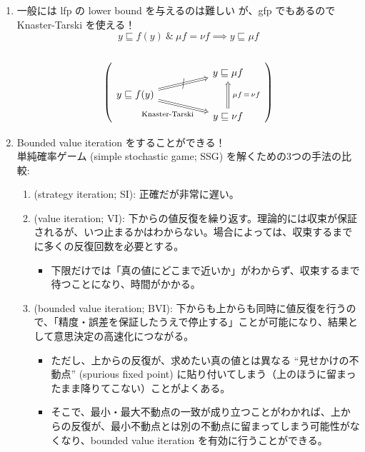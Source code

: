 \documentclass[
		head_space=20mm,
		foot_space=20mm,
		gutter=10mm,
		line_length=190mm
]{jlreq}
\begin{document}
\begin{enumerate}
	\item 一般には lfp の lower bound を与えるのは難しい%
	が、gfp でもあるので Knaster-Tarski を使える！
	\[y\sqsubseteq f(y) ~\&~ \mu f=\nu f\implies y\sqsubseteq \mu f\] ~ \[\left(\begin{tikzcd}[row sep=5pt,column sep=50pt] & y\sqsubseteq \mu f \\ y\sqsubseteq f(y) \ar[ru,Rightarrow,"/" marking,sloped] \ar[rd,Rightarrow,"\textrm{Knaster-Tarski}"',near end] & \\ & y\sqsubseteq \nu f \ar[uu,Rightarrow,"\;\mu f\,=\,\nu f\;"'] \end{tikzcd}\right)\] \vspace{5pt}
	\item Bounded value iteration をすることができる！ \\ 
	単純確率ゲーム (simple stochastic game; SSG) を解くための3つの手法の比較: 
	\begin{enumerate}
		\item {} (strategy iteration; SI): 正確だが非常に遅い。
		\item {} (value iteration; VI): 下からの値反復を繰り返す。理論的には収束が保証されるが、いつ止まるかはわからない。場合によっては、収束するまでに多くの反復回数を必要とする。
		\begin{itemize}
			\item 下限だけでは「真の値にどこまで近いか」がわからず、収束するまで待つことになり、時間がかかる。
		\end{itemize}
		\item {} (bounded value iteration; BVI): 下からも上からも同時に値反復を行うので、「精度・誤差を保証したうえで停止する」ことが可能になり、結果として意思決定の高速化につながる。
		\begin{itemize}
			\item ただし、上からの反復が、求めたい真の値とは異なる ``見せかけの不動点'' (spurious fixed point) に貼り付いてしまう（上のほうに留まったまま降りてこない）ことがよくある。
			\item そこで、最小・最大不動点の一致が成り立つことがわかれば、上からの反復が、最小不動点とは別の不動点に留まってしまう可能性がなくなり、bounded value iteration を有効に行うことができる。
		\end{itemize}

\end{enumerate}
\end{enumerate}
\end{document}
